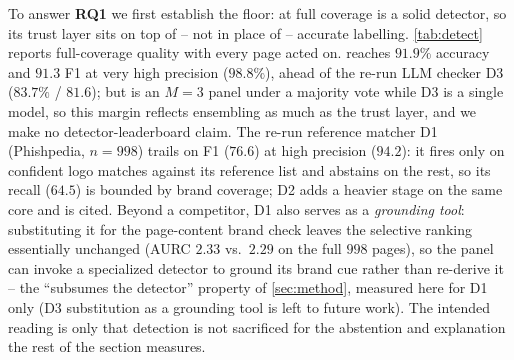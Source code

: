 To answer \textbf{RQ1} we first establish the floor: at full coverage \toolname{} is a
solid detector, so its trust layer sits on top of -- not in place of -- accurate
labelling. \autoref{tab:detect} reports full-coverage quality with every page acted on.
\toolname{} reaches $91.9\%$ accuracy and $91.3$ F1 at very high precision ($98.8\%$),
ahead of the re-run LLM checker D3 ($83.7\%$ / $81.6$); but \toolname{} is an $M{=}3$
panel under a majority vote while D3 is a single model, so this margin reflects
ensembling as much as the trust layer, and we make no detector-leaderboard claim. The
re-run reference matcher D1 (Phishpedia, $n{=}998$) trails on F1 ($76.6$)
at high precision ($94.2$): it fires only on confident logo matches against its
reference list and abstains on the rest, so its recall ($64.5$) is bounded by brand
coverage; D2 adds a heavier stage on the same core and is cited. Beyond a competitor, D1
also serves as a \emph{grounding tool}: substituting it for the page-content brand check
leaves the selective ranking essentially unchanged (AURC $2.33$ vs.\ $2.29$ on the full
$998$ pages), so the panel can invoke a specialized detector to ground its brand cue
rather than re-derive it -- the ``subsumes the detector'' property of \autoref{sec:method},
measured here for D1 only (D3 substitution as a grounding tool is left to future work).
The intended reading is
only that detection is not sacrificed for the abstention and explanation the rest of the
section measures.


